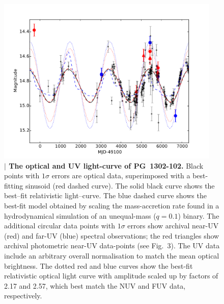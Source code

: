 
\begin{figure}
\centering
\includegraphics[width=0.95\textwidth]{figures/ch4/fig2_Type42.pdf}
\vspace{-15\baselineskip}
\caption{{\bf $\mid$ The optical and UV light-curve of PG~1302-102.}
  Black points with $1\sigma$ errors are optical
  data\cite{Graham+2015}, superimposed with a best-fitting sinusoid
  (red dashed curve). The solid black curve shows the best--fit
  relativistic light--curve. The blue dashed curve shows the best-fit
  model obtained by scaling the mass-accretion rate found in a
  hydrodynamical simulation of an unequal-mass ($q=0.1$)
  binary\cite{Dorazio+2013}.  The additional circular data points with
  $1\sigma$ errors show archival near-UV (red) and far-UV (blue)
  spectral observations; the red triangles show archival photometric
  near-UV data-points (see Fig.~3).  The UV data include an arbitrary
  overall normalisation to match the mean optical brightness.  The
  dotted red and blue curves show the best-fit relativistic optical
  light curve with amplitude scaled up by factors of 2.17 and 2.57,
  which best match the NUV and FUV data, respectively.}
\label{fig:lightcurve}
\end{figure}



